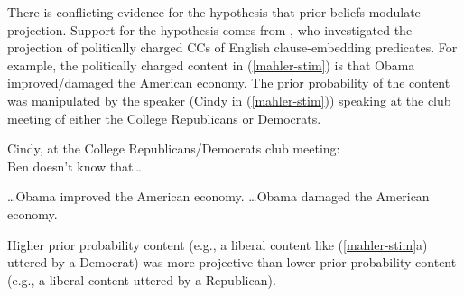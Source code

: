 \documentclass[11pt,fleqn]{article}
\newcommand{\6}{\mbox{$[\hspace*{-.6mm}[$}}
\newcommand{\9}{\mbox{$]\hspace*{-.6mm}]$}}
\begin{document}



%


There is conflicting evidence for the hypothesis that prior beliefs modulate projection. Support for the hypothesis comes from , who investigated the projection of politically charged CCs of 
English clause-embedding predicates. For example, the politically charged content in (\ref{mahler-stim}) is that Obama improved/damaged the American economy. The prior probability of the content was manipulated by the speaker (Cindy in (\ref{mahler-stim})) speaking at the club meeting of either the College Republicans or Democrats.

\begin{exe}
\ex\label{mahler-stim} Cindy, at the College Republicans/Democrats club meeting: \\ Ben doesn't know that\ldots
\begin{xlist}
\ex \ldots Obama improved the American economy.
\ex \ldots Obama damaged the American economy. \hfill \cite[784f.]{mahler2020}
\end{xlist}
\end{exe}
Higher prior probability content (e.g., a liberal content like (\ref{mahler-stim}a) uttered by a Democrat) was more projective than lower prior probability content (e.g., a liberal content uttered by a Republican). 
\end{document}

